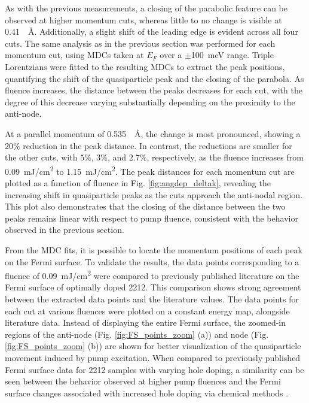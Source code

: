 As with the previous measurements, a closing of the parabolic feature can be observed at higher momentum cuts, whereas little to no change is visible at \qty{0.41}{\per\angstrom}.
Additionally, a slight shift of the leading edge is evident across all four cuts.
The same analysis as in the previous section was performed for each momentum cut, using MDCs taken at $E_F$ over a $\pm$\qty{100}{\milli\electronvolt} range.
Triple Lorentzians were fitted to the resulting MDCs to extract the peak positions, quantifying the shift of the quasiparticle peak and the closing of the parabola.
As fluence increases, the distance between the peaks decreases for each cut, with the degree of this decrease varying substantially depending on the proximity to the anti-node.

At a parallel momentum of \qty{0.535}{\per\angstrom}, the change is most pronounced, showing a $20\%$ reduction in the peak distance.
In contrast, the reductions are smaller for the other cuts, with $5\%$, $3\%$, and $2.7\%$, respectively, as the fluence increases from \qty{0.09}{\milli\joule/\centi\meter\squared} to \qty{1.15}{\milli\joule/\centi\meter\squared}.
The peak distances for each momentum cut are plotted as a function of fluence in Fig. \ref{fig:angdep_deltak}, revealing the increasing shift in quasiparticle peaks as the cuts approach the anti-nodal region.
This plot also demonstrates that the closing of the distance between the two peaks remains linear with respect to pump fluence, consistent with the behavior observed in the previous section.

From the MDC fits, it is possible to locate the momentum positions of each peak on the Fermi surface.
To validate the results, the data points corresponding to a fluence of \qty{0.09}{\milli\joule/\centi\meter\squared} were compared to previously published literature on the Fermi surface of optimally doped 2212.
This comparison shows strong agreement between the extracted data points and the literature values.
The data points for each cut at various fluences were plotted on a constant energy map, alongside literature data.
Instead of displaying the entire Fermi surface, the zoomed-in regions of the anti-node (Fig. \ref{fig:FS_points_zoom} (a)) and node (Fig. \ref{fig:FS_points_zoom} (b)) are shown for better visualization of the quasiparticle movement induced by pump excitation.
When compared to previously published Fermi surface data for 2212 samples with varying hole doping, a similarity can be seen between the behavior observed at higher pump fluences and the Fermi surface changes associated with increased hole doping via chemical methods \cite{drozdov_phase_2018}.

